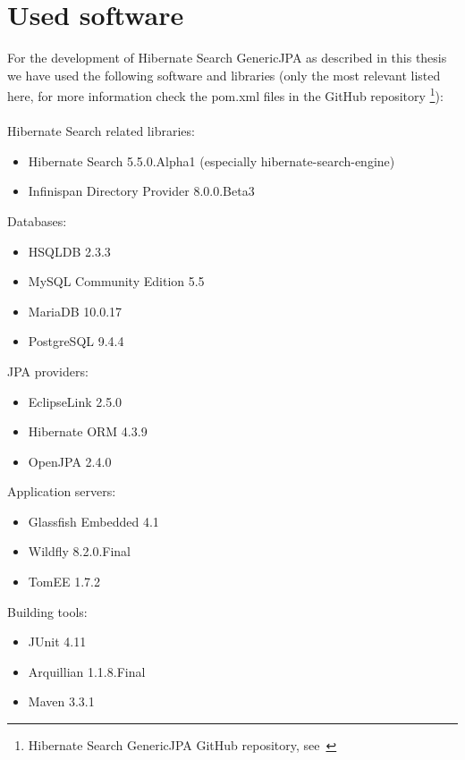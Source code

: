 \section*{Used software}

For the development of Hibernate Search GenericJPA as described in this thesis we have used the following software and libraries (only the most relevant listed here, for more information check the pom.xml files in the GitHub repository \footnote{Hibernate Search GenericJPA GitHub repository, see~\cite{hibernate_genericjpa_github}}):
\\\\
\noindent
Hibernate Search related libraries:
\begin{itemize}
	\item Hibernate Search 5.5.0.Alpha1 (especially hibernate-search-engine)
	\item Infinispan Directory Provider 8.0.0.Beta3
\end{itemize}

\noindent
Databases:
\begin{itemize}
	\item HSQLDB 2.3.3
	\item MySQL Community Edition 5.5
	\item MariaDB 10.0.17
	\item PostgreSQL 9.4.4
\end{itemize}

\noindent
JPA providers:
\begin{itemize}
	\item EclipseLink 2.5.0
	\item Hibernate ORM 4.3.9
	\item OpenJPA 2.4.0
\end{itemize}

\noindent
Application servers:
\begin{itemize}
	\item Glassfish Embedded 4.1
	\item Wildfly 8.2.0.Final
	\item TomEE 1.7.2
\end{itemize}

\noindent
Building tools:
\begin{itemize}
	\item JUnit 4.11
	\item Arquillian 1.1.8.Final
	\item Maven 3.3.1
\end{itemize}

\pagebreak

